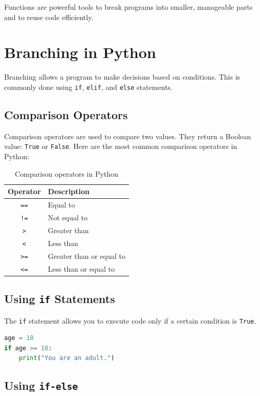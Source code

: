 \documentclass{article}
\begin{document}
Functions are powerful tools to break programs into smaller, manageable parts and to reuse code efficiently.

\section{Branching in Python}

Branching allows a program to make decisions based on conditions.  
This is commonly done using \texttt{if}, \texttt{elif}, and \texttt{else} statements.

\subsection{Comparison Operators}

Comparison operators are used to compare two values.  
They return a Boolean value: \texttt{True} or \texttt{False}.  
Here are the most common comparison operators in Python:

\begin{table}[H]
\centering
\begin{tabular}{|c|l|}
\hline
\textbf{Operator} & \textbf{Description} \\ \hline
\texttt{==} & Equal to \\ \hline
\texttt{!=} & Not equal to \\ \hline
\texttt{>} & Greater than \\ \hline
\texttt{<} & Less than \\ \hline
\texttt{>=} & Greater than or equal to \\ \hline
\texttt{<=} & Less than or equal to \\ \hline
\end{tabular}
\caption{Comparison operators in Python}
\end{table}

\subsection{Using \texttt{if} Statements}

The \texttt{if} statement allows you to execute code only if a certain condition is \texttt{True}.

\begin{lstlisting}[language=Python]
age = 18
if age >= 18:
    print("You are an adult.")
\end{lstlisting}

\subsection{Using \texttt{if-else}}
\end{document}

